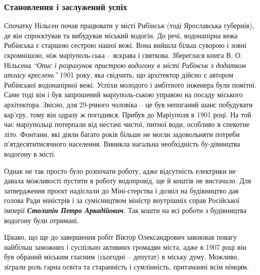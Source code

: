  
 
 
 
 

\subsubsection{Становлення і заслужений успіх}


Спочатку Нільсен почав працювати у місті Рибінськ (тоді Ярославська губернія),
де він спроєктував та вибудував міський водогін. До речі, водонапірна вежа
Рибінська є старшою сестрою нашої вежі. Вона вийшла більш суворою і зовні
скромнішою, ніж маріуполь\hyp{}ська – яскрава і святкова. Збереглася книга В. О.
Нільсена \emph{\enquote{Опис і розрахунок пристрою водогону в місті Рибінськ з додатком
атласу креслень}} 1901 року, яка свідчить, що архітектор дійсно є автором
Рибінської водонапірної вежі. Успіхи молодого і амбітного інженера були
помітні. Саме тоді він і був запрошений маріуполь\hyp{}ською управою на посаду
міського архітектора. Звісно, для 29-рчного чоловіка – це був непоганий шанс
побудувати кар'єру, тому він одразу ж погодився. Прибув до Маріуполя в 1901
році. На той час маріупольці потерпали від нестачі чистої, питної води,
особливо в спекотне літо. Фонтани, які діяли багато років більше не могли
задовольняти потреби п'ятдесятитисячного населення. Виникла нагальна
необхідність бу\hyp{}дівництва водогону в місті.

Однак не так просто було розпочати роботу, адже відсутність електрики не давала
можливості пустити в роботу водопровід, ще й коштів не вистачало. Для
затвердження проєкт надіслали до Міні\hyp{}стерства і дозвіл на будівництво дав
голова Ради міністрів і за сумісництвом міністр внутрішніх справ Російської
імперії \emph{\textbf{Столипін Петро Аркадійович}}. Так кошти на всі роботи з будівництва
водогону були отримані.

Цікаво, що ще до завершення робіт Віктор Олександрович завоював повагу найбільш
заможних і суспільно активних громадян міста, адже в 1907 році він був обраний
міським гласним (сьогодні – депутат) в міську думу. Можливо, зіграли роль гарна
освіта та старанність і сумлінність, притаманні всім німцям.

